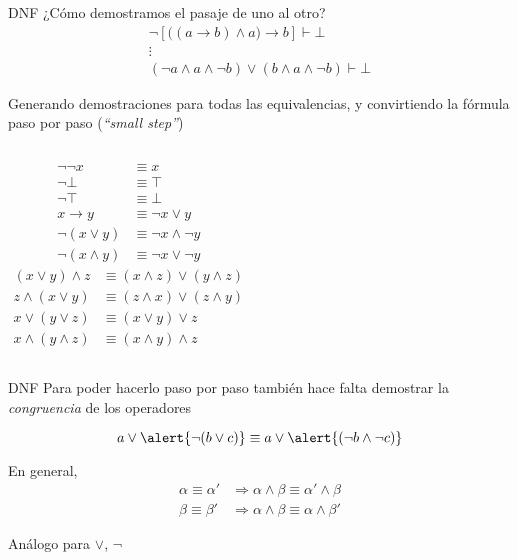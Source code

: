 \documentclass[xcolor={dvipsnames},spanish]{beamer}
\begin{document}
\begin{frame}{DNF}
    ¿Cómo demostramos el pasaje de uno al otro?
    \begin{gather*}
        \neg [ \big( (a \to b) \wedge a \big) \to b ] \vdash \bot\\
        \vdots\\
        (\neg a \wedge a \wedge \neg b) \vee (b \wedge a \wedge \neg b) \vdash \bot
    \end{gather*}

    Generando demostraciones para todas las equivalencias, y convirtiendo la fórmula paso por paso (\textit{``small step''})
    \begin{columns}
        \begin{align*}
        \neg\neg x &\equiv x\\
        \neg \bot &\equiv \top\\
        \neg \top &\equiv \bot\\
        x \to y &\equiv \neg x \vee y\\
        \neg(x \vee y) &\equiv \neg x \wedge \neg y\\
        \neg(x \wedge y) &\equiv \neg x \vee \neg y
    \end{align*}
        \begin{align*}
            (x \vee y) \wedge z &\equiv (x \wedge z) \vee (y \wedge z)\\
            z \wedge (x \vee y) &\equiv (z \wedge x) \vee (z \wedge y)\\
            x \vee (y \vee z) &\equiv (x \vee y) \vee z\\
            x \wedge (y \wedge z) &\equiv (x \wedge y) \wedge z
        \end{align*}
    \end{columns}
\end{frame}

\begin{frame}{DNF}
    Para poder hacerlo paso por paso también hace falta demostrar la \textit{congruencia} de los operadores

    \[
        a \vee \alert{\neg (b \vee c)}
        \equiv
        a \vee \alert{(\neg b \wedge \neg c)}
    \]

    En general,
    \begin{align*}
        \alpha \equiv \alpha' &\Rightarrow \alpha \wedge \beta \equiv \alpha' \wedge \beta\\
        \beta \equiv \beta' &\Rightarrow \alpha \wedge \beta \equiv \alpha \wedge \beta'
    \end{align*}

    Análogo para $\vee$, $\neg$
\end{frame}
\end{document}
